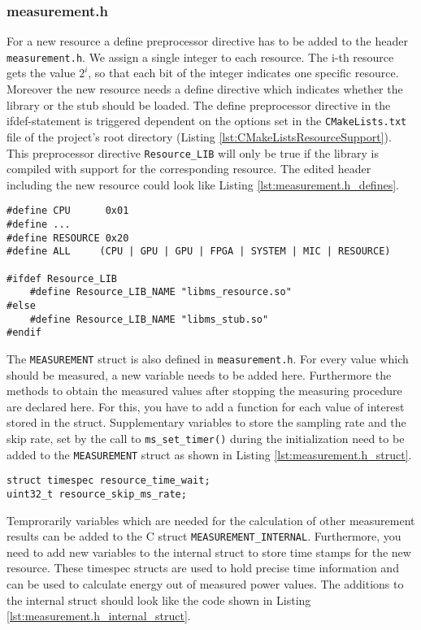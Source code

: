 \subsubsection{measurement.h}
\label{sec:measurement_h}
For a new resource a define preprocessor directive has to be added to the header \texttt{measurement.h}. We assign a single integer to each resource. The i-th resource gets the value $2^{i}$, so that each bit of the integer indicates one specific resource. Moreover the new resource needs a define directive which indicates whether the library or the stub should be loaded. The define preprocessor directive in the ifdef-statement is triggered dependent on the options set in the \texttt{CMakeLists.txt} file of the project's root directory (Listing \ref{lst:CMakeListsResourceSupport}). This preprocessor directive \texttt{Resource\_LIB} will only be true if the library is compiled with support for the corresponding resource. The edited header including the new resource could look like Listing \ref{lst:measurement.h_defines}.
\begin{lstlisting}[caption={Extended \texttt{measurement.h} header file with new define directives to support a new resource.},label=lst:measurement.h_defines]
#define CPU		 0x01
#define ...
#define RESOURCE 0x20
#define ALL		(CPU | GPU | GPU | FPGA | SYSTEM | MIC | RESOURCE)
		
#ifdef Resource_LIB
	#define Resource_LIB_NAME "libms_resource.so"
#else
	#define Resource_LIB_NAME "libms_stub.so"
#endif
\end{lstlisting}
The \texttt{MEASUREMENT} struct is also defined in \texttt{measurement.h}. For every value which should be measured, a new variable needs to be added here. Furthermore the methods to obtain the measured values after stopping the measuring procedure are declared here. For this, you have to add a function for each value of interest stored in the struct. Supplementary variables to store the sampling rate and the skip rate, set by the call to \texttt{ms\_set\_timer()} during the initialization need to be added to the \texttt{MEASUREMENT} struct as shown in Listing \ref{lst:measurement.h_struct}.
\begin{lstlisting}[caption={Mandatory extensions for the \texttt{MEAUSREMENT} struct defined in \texttt{measurement.h}.},label=lst:measurement.h_struct]
struct timespec resource_time_wait;
uint32_t resource_skip_ms_rate;
\end{lstlisting}
Temprorarily variables which are needed for the calculation of other measurement results can be added to the C struct \texttt{MEASUREMENT\_INTERNAL}. Furthermore, you need to add new variables to the internal struct to store time stamps for the new resource. These timespec structs are used to hold precise time information and can be used to calculate energy out of measured power values. The additions to the internal struct should look like the code shown in Listing \ref{lst:measurement.h_internal_struct}.
